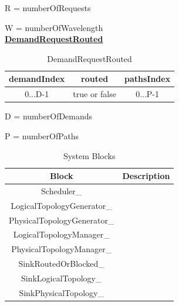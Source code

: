 R = numberOfRequests\par
W = numberOfWavelength\\  


\underline{\textbf{DemandRequestRouted}}

\begin{table}[H]
	\centering
	\begin{tabular}{| c | c | c |}
		\hline
		\textbf{demandIndex} & \textbf{routed}  & \textbf{pathsIndex}\\ \hline
		0...D-1              & true or false           & 0...P-1            \\ \hline
	\end{tabular}
	\caption{DemandRequestRouted}
	\label{demand_request_routed}
\end{table}

D = numberOfDemands\par
P = numberOfPaths\\


\newpage
\vspace{11pt}

\begin{table}[H]
	\centering
	\begin{tabular}{| c | c |}
		\hline
		\textbf{Block}              & \textbf{Description}\\ \hline
		Scheduler\_                 &                     \\ \hline
		LogicalTopologyGenerator\_  &                     \\ \hline
		PhysicalTopologyGenerator\_ &                     \\ \hline
		LogicalTopologyManager\_    &                     \\ \hline
		PhysicalTopologyManager\_   &                     \\ \hline
		SinkRoutedOrBlocked\_       &                     \\ \hline
		SinkLogicalTopology\_       &                     \\ \hline
		SinkPhysicalTopology\_      &                     \\ \hline
	\end{tabular}
	\caption{System Blocks}
	\label{system_blocks}
\end{table}


